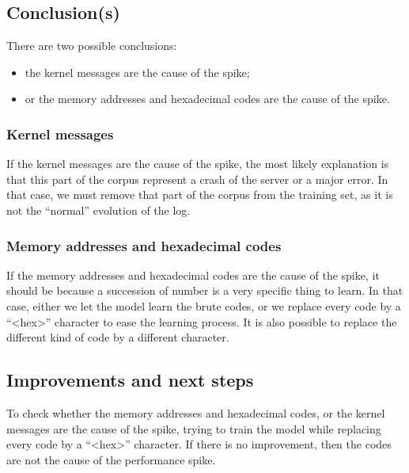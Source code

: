 \subsection{Conclusion(s)}

There are two possible conclusions:
\begin{itemize}
\item the kernel messages are the cause of the spike;
\item or the memory addresses and hexadecimal codes are the cause of the spike.
\end{itemize}

\subsubsection{Kernel messages}

If the kernel messages are the cause of the spike, the most likely
explanation is that this part of the corpus represent a crash of the
server or a major error. In that case, we must remove that part of the
corpus from the training set, as it is not the ``normal'' evolution of
the log.

\subsubsection{Memory addresses and hexadecimal codes}

If the memory addresses and hexadecimal codes are the cause of the
spike, it should be because a succession of number is a very specific
thing to learn. In that case, either we let the model learn the brute
codes, or we replace every code by a ``<hex>'' character to ease the learning
process. It is also possible to replace the different kind of code by a
different character.

\subsection{Improvements and next steps}

To check whether the memory addresses and hexadecimal codes, or the
kernel messages are the cause of the spike, trying to train the model
while replacing every code by a ``<hex>'' character. If there is no
improvement, then the codes are not the cause of the performance spike.
